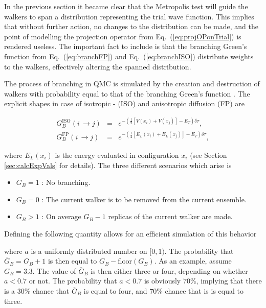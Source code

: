 In the previous section it became clear that the Metropolis test will guide the walkers to span a distribution representing the trial wave function. This implies that without further action, no changes to the distribution can be made, and the point of modelling the projection operator from Eq.~(\ref{eq:projOPonTrial}) is rendered useless. The important fact to include is that the branching Green's function from Eq.~(\ref{eq:branchFP}) and Eq.~(\ref{eq:branchISO}) distribute weights to the walkers, effectively altering the spanned distribution. 

The process of branching in QMC is simulated by the creation and destruction of walkers with probability equal to that of the branching Green's function \cite{abInitioMC}. The explicit shapes in case of isotropic - (ISO) and anisotropic diffusion (FP) are

\begin{eqnarray}
 G_B^\mathrm{ISO}(i\,\rightarrow j) &=& e^{-\left(\frac{1}{2}\left[V(x_i) + V(x_j)\right] - E_T\right)\delta\tau}\label{eq:branchISO}, \\
 G_B^\mathrm{FP}(i\,\rightarrow j) &=& e^{-\left(\frac{1}{2}\left[E_L(x_i) + E_L(x_j)\right] - E_T\right)\delta\tau}, \label{eq:branchFP}
\end{eqnarray}

where $E_L(x_i)$ is the energy evaluated in configuration $x_i$ (see Section \ref{sec:calcExpVals} for details). The three different scenarios which arise is

\begin{itemize}
 \item $G_B = 1$ : No branching.
 \item $G_B = 0$ : The current walker is to be removed from the current ensemble.
 \item $G_B > 1$ : On average $G_B - 1$ replicas of the current walker are made.
\end{itemize}

Defining the following quantity allows for an efficient simulation of this behavior



where $a$ is a uniformly distributed number on $[0,1)$. The probability that $\overline{G}_B = G_B + 1$ is then equal to $G_B - \mathrm{floor}(G_B)$. As an example, assume $G_B = 3.3$. The value of $\overline{G}_B$ is then either three or four, depending on whether $a < 0.7$ or not. The probability that $a<0.7$ is obviously $70\%$, implying that there is a $30\%$ chance that $\overline{G}_B$ is equal to four, and $70\%$ chance that is is equal to three. 

